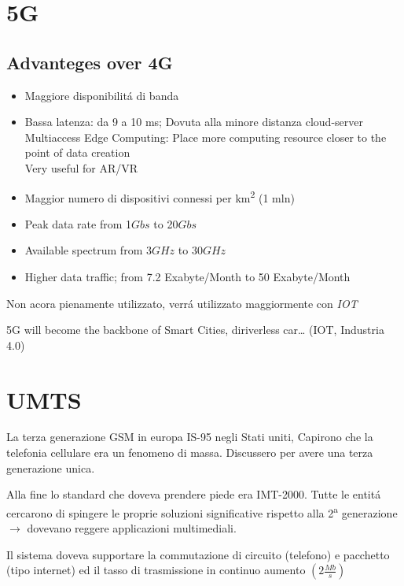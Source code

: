\documentclass{article}
\begin{document}
\newpage

\section{5G}

\subsection{Advanteges over 4G}

\begin{itemize}
    \item Maggiore disponibilit\'a di banda
    \item Bassa latenza: da 9 a 10 ms; Dovuta alla minore distanza cloud-server\\
        Multiaccess Edge Computing: Place more computing resource closer to the point of data creation\\
        Very useful for AR/VR

    \item Maggior numero di dispositivi connessi per km\textsuperscript{2} (1 mln)
    \item Peak data rate from 1\(Gbs\) to 20\(Gbs\)
    \item Available spectrum from 3\(GHz\) to 30\(GHz\)
    \item Higher data traffic; from 7.2 Exabyte/Month to 50 Exabyte/Month

\end{itemize}


Non acora pienamente utilizzato, verr\'a utilizzato maggiormente con \textit{IOT}


5G will become the backbone of Smart Cities, diriverless car… (IOT, Industria 4.0)

\newpage
\section{UMTS}
La terza generazione GSM in europa IS-95 negli Stati uniti, Capirono che la telefonia cellulare era un fenomeno di massa.
Discussero per avere una terza generazione unica.

Alla fine lo standard che doveva prendere piede era IMT-2000. Tutte le entit\'a cercarono di spingere le proprie soluzioni significative rispetto alla 2\textsuperscript{a} generazione $\rightarrow$ dovevano reggere applicazioni multimediali.

Il sistema doveva supportare la commutazione di circuito (telefono) e pacchetto (tipo internet) ed il tasso di trasmissione in continuo aumento $\left(2\frac{Mb}{s}\right)$
\end{document}
